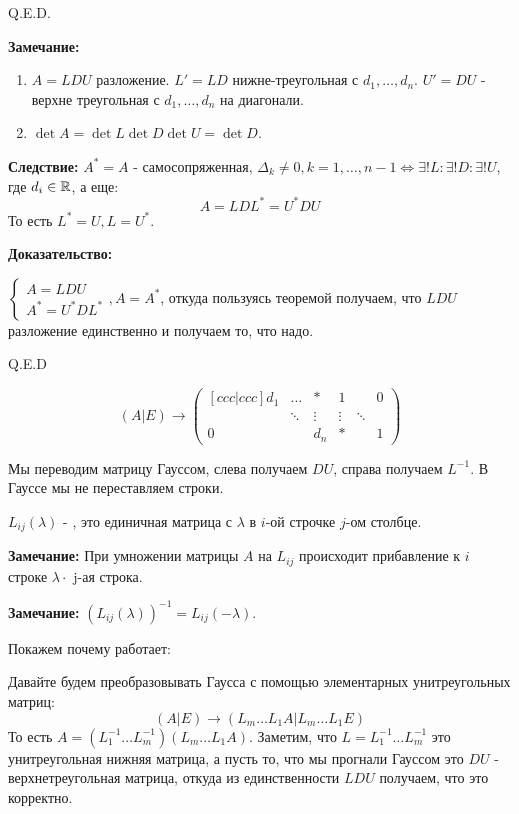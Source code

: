     
    \hfill Q.E.D.
    

\textbf{Замечание:}
\begin{enumerate}
    \item $A = LDU$ разложение. $L' =LD$ нижне-треугольная с $d_1,\ldots,d_n$. $U' = DU$ - верхне треугольная с $d_1,\ldots,d_n$ на диагонали.
    \item $\det A = \det L \det D  \det U = \det D$.

\end{enumerate}

\textbf{Следствие:} $A^* = A$  - самосопряженная, $\Delta_k \neq 0 , k = 1, \ldots, n-1 \Leftrightarrow \exists ! L : \exists! D : \exists! U$, где $d_i\in \mathbb{R}$, а еще:
$$A = LDL^* = U^*DU$$
То есть $L^* = U, L = U^*$.

\textbf{Доказательство:}

$\begin{cases}
    A = LDU\\
    A^* = U^*DL^*
\end{cases}, A = A^*$, откуда пользуясь теоремой получаем, что $LDU$ разложение единственно и получаем то, что надо.

\hfill Q.E.D


$$(A | E) \rightarrow{} \begin{pmatrix}[ccc|ccc]
    d_1 & \ldots & * & 1 &        & 0\\
     & \ddots &\vdots &  \vdots  &\ddots & \\
     0 & & d_n   & * & &1
\end{pmatrix}$$

Мы переводим матрицу Гауссом, слева получаем $DU$, справа получаем $L^{-1}$. В Гауссе мы не переставляем строки.

 $L_{ij}(\lambda)$ - , это единичная матрица с $\lambda$ в $i$-ой строчке $j$-ом столбце.

\textbf{Замечание:} При умножении матрицы $A$ на $L_{ij}$ происходит прибавление к $i$ строке $\lambda \cdot$ j-ая строка. 

\textbf{Замечание:} $(L_{ij}(\lambda))^{-1} = L_{ij}(-\lambda)$.

Покажем почему работает:

Давайте будем преобразовывать Гаусса с помощью элементарных унитреугольных матриц:
$$(A|E) \rightarrow{} (L_m\ldots L_1 A | L_m\ldots L_1 E)$$
То есть $A = (L_1^{-1}\ldots L_{m}^{-1})(L_m\ldots L_1A)$. Заметим, что $L= L_{1}^{-1}\ldots L_m^{-1}$ это унитреугольная нижняя матрица, а пусть то, что мы прогнали Гауссом это $DU$ - верхнетреугольная матрица, откуда из единственности $LDU$ получаем, что это корректно.




